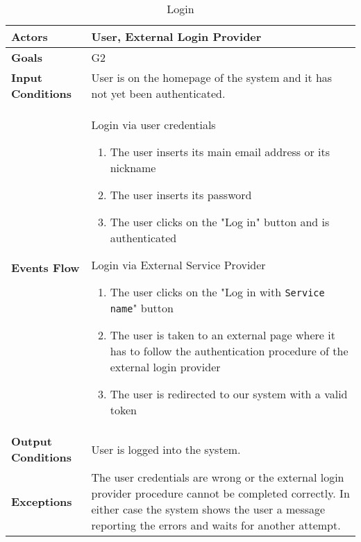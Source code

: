 \begin{table}[H]
	\centering
	\def\arraystretch{1.5}
	\begin{tabular}{|p{7cm}|p{7cm}|}
		\hline
		\textbf{Actors}            & User, External Login Provider		    \\ \hline
		\textbf{Goals}             & G2           \\ \hline
		\textbf{Input Conditions}  & User is on the homepage of the system and it has not yet been authenticated.           \\ \hline
		\textbf{Events Flow}       &    
		 	Login via user credentials
			 	\begin{enumerate}
			 		\item The user inserts its main email address or its nickname
			 		\item The user inserts its password
			 		\item The user clicks on the "Log in" button and is authenticated
			 	\end{enumerate}
		 	Login via External Service Provider
			 	\begin{enumerate}
				 	\item The user clicks on the "Log in with \texttt{Service name}" button
				 	\item The user is taken to an external page where it has to follow the authentication procedure of the external login provider
				 	\item The user is redirected to our system with a valid token
			 	\end{enumerate} \\ \hline
		\textbf{Output Conditions} & User is logged into the system.          \\ \hline
		\textbf{Exceptions}        & The user credentials are wrong or the external login provider procedure cannot be completed correctly. In either case the system shows the user a message reporting the errors and waits for another attempt.         \\ \hline
	\end{tabular}
	\caption{Login}
\end{table}

